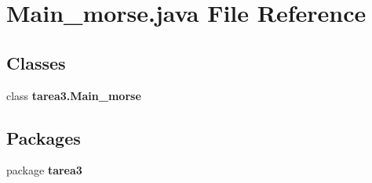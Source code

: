 \section{Main\+\_\+morse.\+java File Reference}
\label{_main__morse_8java}
\subsection*{Classes}
\begin{DoxyCompactItemize}
\item 
class {\bf tarea3.\+Main\+\_\+morse}
\end{DoxyCompactItemize}
\subsection*{Packages}
\begin{DoxyCompactItemize}
\item 
package {\bf tarea3}
\end{DoxyCompactItemize}
